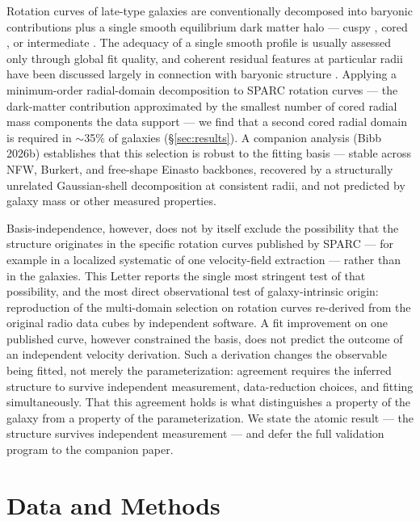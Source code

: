 \documentclass[twocolumn]{aastex701}
\begin{document}
Rotation curves of late-type galaxies are conventionally decomposed into
baryonic contributions plus a single smooth equilibrium dark matter halo ---
cuspy \citep[NFW;][]{Navarro1996}, cored \citep[Burkert;][]{Burkert1995}, or
intermediate \citep[Einasto;][]{Einasto1965}. The adequacy of a single smooth
profile is usually assessed only through global fit quality, and coherent
residual features at particular radii have been discussed largely in connection
with baryonic structure \citep[``Renzo's rule'';][]{Sancisi2004}. Applying a
minimum-order radial-domain decomposition to SPARC rotation curves
\citep{Lelli2016} --- the dark-matter contribution approximated by the smallest number
of cored radial mass components the data support --- we find that a second cored radial
domain is required in $\sim$35\% of galaxies (\S\ref{sec:results}). A companion
analysis (Bibb 2026b) establishes that this selection is robust to the fitting basis
--- stable across NFW, Burkert, and free-shape Einasto backbones, recovered by a
structurally unrelated Gaussian-shell decomposition at consistent radii, and not
predicted by galaxy mass or other measured properties.

Basis-independence, however, does not by itself exclude the possibility that the
structure originates in the specific rotation curves published by SPARC --- for
example in a localized systematic of one velocity-field extraction --- rather
than in the galaxies. This Letter reports the single most stringent test of that
possibility, and the most direct observational test of galaxy-intrinsic origin:
reproduction of the multi-domain selection on rotation curves re-derived from the
original radio data cubes by independent software. A fit improvement on one
published curve, however constrained the basis, does not predict the outcome of
an independent velocity derivation. Such a derivation changes the observable being
fitted, not merely the parameterization: agreement requires the inferred structure to
survive independent measurement, data-reduction choices, and fitting simultaneously.
That this agreement holds is what distinguishes a property of the galaxy from a property
of the parameterization. We state the atomic result --- the
structure survives independent measurement --- and defer the full validation program
to the companion paper.

\section{Data and Methods} \label{sec:methods}
\end{document}
